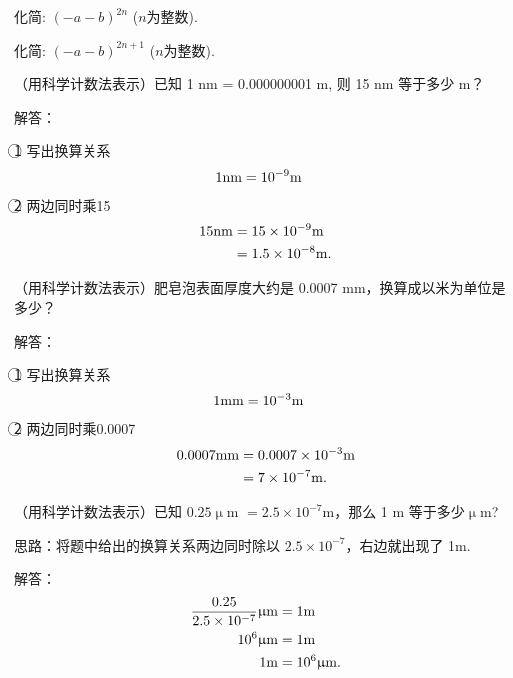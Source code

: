 \item{
    化简: $(-a-b)^{2n}$ ($n$为整数).
}
\item{
    化简: $(-a-b)^{2n+1}$ ($n$为整数).
}
\item{
    （用科学计数法表示）已知 1 nm = 0.000000001 m, 则 15 nm 等于多少 m？

    \fangsong{}
    解答：

    \textcircled{1} 写出换算关系
    \begin{align*}
        1 \rm{nm} &= 10^{-9} \rm{m}
    \end{align*}
    \textcircled{2} 两边同时乘15
    \begin{align*}
        15 \rm{nm} &= 15 \times 10^{-9} \rm{m}\\
        &= 1.5\times 10^{-8} \rm{m}.
    \end{align*}
}
\item{
    （用科学计数法表示）肥皂泡表面厚度大约是 0.0007 mm，换算成以米为单位是多少？

    \fangsong{}
    解答：

    \textcircled{1} 写出换算关系
    \begin{align*}
        1 \rm{mm} &= 10^{-3} \rm{m}
    \end{align*}
    \textcircled{2} 两边同时乘0.0007
    \begin{align*}
        0.0007 \rm{mm} &= 0.0007 \times 10^{-3} \rm{m}\\
        &= 7\times 10^{-7} \rm{m}.
    \end{align*}
}
\item{
    （用科学计数法表示）已知 $0.25 \upmu$m $ = 2.5\times 10^{-7}$m，那么 1 m 等于多少$\upmu$m?

    \fangsong{}
    思路：将题中给出的换算关系两边同时除以 $2.5\times 10^{-7}$，右边就出现了 1m.

    解答：
    \begin{align*}
        \frac{0.25}{2.5\times 10^{-7}} \rm{\upmu m} &= 1\rm{m}\\
        10^6 \rm{\upmu m} &= 1\rm{m}\\
        1\rm{m} &= 10^6 \rm{\upmu m}.
    \end{align*}
}
